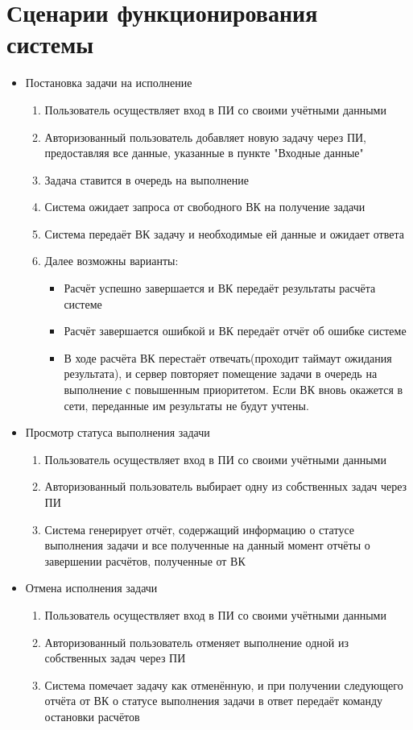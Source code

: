 \documentclass[a4paper,12pt]{report}
\numberwithin{equation}{section}
\begin{document}
\section{Сценарии функционирования системы}
\begin{itemize}
  \item Постановка задачи на исполнение
  \begin{enumerate}
    \item Пользователь осуществляет вход в ПИ со своими учётными данными
    \item Авторизованный пользователь добавляет новую задачу через ПИ, предоставляя все данные, указанные в пункте "Входные данные"
    \item Задача ставится в очередь на выполнение
    \item Система ожидает запроса от свободного ВК на получение задачи
    \item Система передаёт ВК задачу и необходимые ей данные и ожидает ответа
    \item Далее возможны варианты:
      \begin{itemize}
        \item Расчёт успешно завершается и ВК передаёт результаты расчёта системе
        \item Расчёт завершается ошибкой и ВК передаёт отчёт об ошибке системе
        \item В ходе расчёта ВК перестаёт отвечать(проходит таймаут ожидания результата), и сервер повторяет помещение задачи в очередь на выполнение с повышенным приоритетом. Если ВК вновь окажется в сети, переданные им результаты не будут учтены.
      \end{itemize}
  \end{enumerate}
    
  \item Просмотр статуса выполнения задачи
  \begin{enumerate}
    \item Пользователь осуществляет вход в ПИ со своими учётными данными
    \item Авторизованный пользователь выбирает одну из собственных задач через ПИ
    \item Система генерирует отчёт, содержащий информацию о статусе выполнения задачи и все полученные на данный момент отчёты о завершении расчётов, полученные от ВК
  \end{enumerate}
  
  \item Отмена исполнения задачи
  \begin{enumerate}
    \item Пользователь осуществляет вход в ПИ со своими учётными данными
    \item Авторизованный пользователь отменяет выполнение одной из собственных задач через ПИ
    \item Система помечает задачу как отменённую, и при получении следующего отчёта от ВК о статусе выполнения задачи в ответ передаёт команду остановки расчётов
  \end{enumerate}
\end{itemize}
\end{document}

